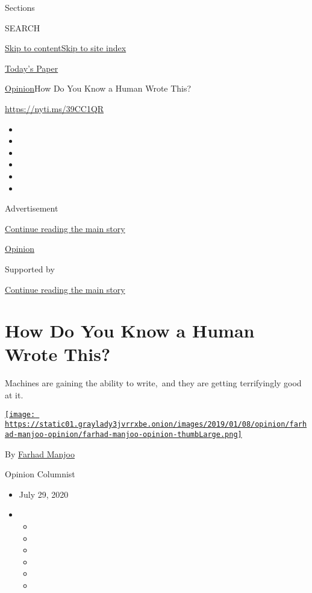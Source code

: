Sections

SEARCH

\protect\hyperlink{site-content}{Skip to
content}\protect\hyperlink{site-index}{Skip to site index}

\href{https://myaccount.nytimes3xbfgragh.onion/auth/login?response_type=cookie\&client_id=vi}{}

\href{https://www.nytimes3xbfgragh.onion/section/todayspaper}{Today's
Paper}

\href{/section/opinion}{Opinion}\textbar{}How Do You Know a Human Wrote
This?

\url{https://nyti.ms/39CC1QR}

\begin{itemize}
\item
\item
\item
\item
\item
\item
\end{itemize}

Advertisement

\protect\hyperlink{after-top}{Continue reading the main story}

\href{/section/opinion}{Opinion}

Supported by

\protect\hyperlink{after-sponsor}{Continue reading the main story}

\hypertarget{how-do-you-know-a-human-wrote-this}{%
\section{How Do You Know a Human Wrote
This?}\label{how-do-you-know-a-human-wrote-this}}

Machines are gaining the ability to write,~and they are getting
terrifyingly good at it.

\href{https://www.nytimes3xbfgragh.onion/by/farhad-manjoo}{\texttt{[image: https://static01.graylady3jvrrxbe.onion/images/2019/01/08/opinion/farhad-manjoo-opinion/farhad-manjoo-opinion-thumbLarge.png]}}

By \href{https://www.nytimes3xbfgragh.onion/by/farhad-manjoo}{Farhad
Manjoo}

Opinion Columnist

\begin{itemize}
\item
  July 29, 2020
\item
  \begin{itemize}
  \item
  \item
  \item
  \item
  \item
  \item
  \end{itemize}
\end{itemize}

